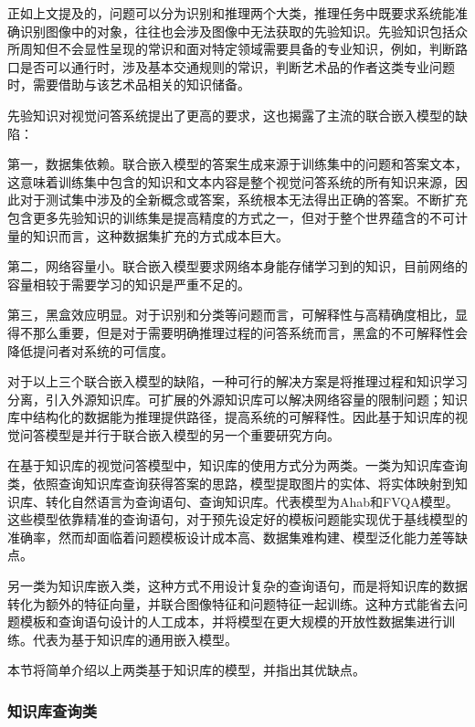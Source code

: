 正如上文提及的，问题可以分为识别和推理两个大类，推理任务中既要求系统能准确识别图像中的对象，往往也会涉及图像中无法获取的先验知识。先验知识包括众所周知但不会显性呈现的常识和面对特定领域需要具备的专业知识，例如，判断路口是否可以通行时，涉及基本交通规则的常识，判断艺术品的作者这类专业问题时，需要借助与该艺术品相关的知识储备。

先验知识对视觉问答系统提出了更高的要求，这也揭露了主流的联合嵌入模型的缺陷：

第一，数据集依赖。联合嵌入模型的答案生成来源于训练集中的问题和答案文本，这意味着训练集中包含的知识和文本内容是整个视觉问答系统的所有知识来源，因此对于测试集中涉及的全新概念或答案，系统根本无法得出正确的答案。不断扩充包含更多先验知识的训练集是提高精度的方式之一，但对于整个世界蕴含的不可计量的知识而言，这种数据集扩充的方式成本巨大。

第二，网络容量小。联合嵌入模型要求网络本身能存储学习到的知识，目前网络的容量相较于需要学习的知识是严重不足的。

第三，黑盒效应明显。对于识别和分类等问题而言，可解释性与高精确度相比，显得不那么重要，但是对于需要明确推理过程的问答系统而言，黑盒的不可解释性会降低提问者对系统的可信度。

对于以上三个联合嵌入模型的缺陷，一种可行的解决方案是将推理过程和知识学习分离，引入外源知识库。可扩展的外源知识库可以解决网络容量的限制问题；知识库中结构化的数据能为推理提供路径，提高系统的可解释性。因此基于知识库的视觉问答模型是并行于联合嵌入模型的另一个重要研究方向。

在基于知识库的视觉问答模型中，知识库的使用方式分为两类。一类为知识库查询类，依照查询知识库查询获得答案的思路，模型提取图片的实体、将实体映射到知识库、转化自然语言为查询语句、查询知识库。代表模型为Ahab和FVQA模型。这些模型依靠精准的查询语句，对于预先设定好的模板问题能实现优于基线模型的准确率，然而却面临着问题模板设计成本高、数据集难构建、模型泛化能力差等缺点。

另一类为知识库嵌入类，这种方式不用设计复杂的查询语句，而是将知识库的数据转化为额外的特征向量，并联合图像特征和问题特征一起训练。这种方式能省去问题模板和查询语句设计的人工成本，并将模型在更大规模的开放性数据集进行训练。代表为基于知识库的通用嵌入模型。

本节将简单介绍以上两类基于知识库的模型，并指出其优缺点。

\subsubsection{知识库查询类}

